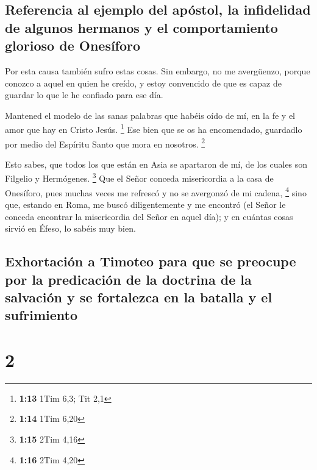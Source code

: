 \hypertarget{referencia-al-ejemplo-del-apuxf3stol-la-infidelidad-de-algunos-hermanos-y-el-comportamiento-glorioso-de-onesuxedforo}{%
\subsection{Referencia al ejemplo del apóstol, la infidelidad de algunos
hermanos y el comportamiento glorioso de
Onesíforo}\label{referencia-al-ejemplo-del-apuxf3stol-la-infidelidad-de-algunos-hermanos-y-el-comportamiento-glorioso-de-onesuxedforo}}

 Por esta causa también sufro estas cosas. Sin embargo,
no me avergüenzo, porque conozco a aquel en quien he creído, y estoy
convencido de que es capaz de guardar lo que le he confiado para ese
día.

 Mantened el modelo de las sanas palabras que habéis oído
de mí, en la fe y el amor que hay en Cristo Jesús. \footnote{\textbf{1:13}
  1Tim 6,3; Tit 2,1}  Ese bien que se os ha encomendado,
guardadlo por medio del Espíritu Santo que mora en nosotros. \footnote{\textbf{1:14}
  1Tim 6,20}

 Esto sabes, que todos los que están en Asia se apartaron
de mí, de los cuales son Filgelio y Hermógenes. \footnote{\textbf{1:15}
  2Tim 4,16}  Que el Señor conceda misericordia a la casa
de Onesíforo, pues muchas veces me refrescó y no se avergonzó de mi
cadena, \footnote{\textbf{1:16} 2Tim 4,20}  sino que,
estando en Roma, me buscó diligentemente y me encontró 
(el Señor le conceda encontrar la misericordia del Señor en aquel día);
y en cuántas cosas sirvió en Éfeso, lo sabéis muy bien.

\hypertarget{exhortaciuxf3n-a-timoteo-para-que-se-preocupe-por-la-predicaciuxf3n-de-la-doctrina-de-la-salvaciuxf3n-y-se-fortalezca-en-la-batalla-y-el-sufrimiento}{%
\subsection{Exhortación a Timoteo para que se preocupe por la
predicación de la doctrina de la salvación y se fortalezca en la batalla
y el
sufrimiento}\label{exhortaciuxf3n-a-timoteo-para-que-se-preocupe-por-la-predicaciuxf3n-de-la-doctrina-de-la-salvaciuxf3n-y-se-fortalezca-en-la-batalla-y-el-sufrimiento}}

\hypertarget{section-1}{%
\section{2}\label{section-1}}

